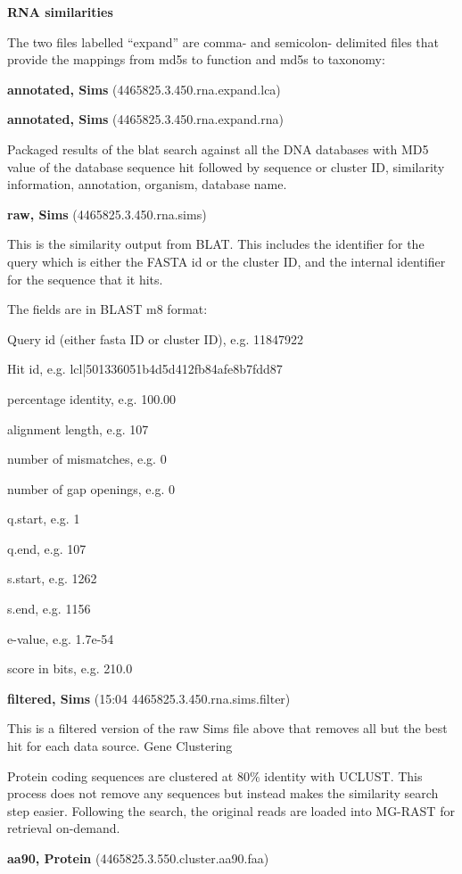 \documentclass[12pt,fullpage]{report}
\begin{document}
\begin{appendices}
\begin{mdframed}
\textbf{RNA similarities}

The two files labelled ``expand'' are comma- and semicolon- delimited files that provide the mappings from md5s to function and md5s to taxonomy:

\textbf{annotated, Sims} (4465825.3.450.rna.expand.lca)

\textbf{annotated, Sims} (4465825.3.450.rna.expand.rna)

Packaged results of the blat search against all the DNA databases with \gls{MD5} value of the database sequence hit followed by sequence or cluster ID, similarity information, annotation, organism, database name.

\textbf{raw, Sims} (4465825.3.450.rna.sims)

This is the similarity output from BLAT. This includes the identifier for the query which is either the FASTA id or the cluster ID, and the internal identifier for the sequence that it hits.

The fields are in BLAST m8 format:

    Query id (either fasta ID or cluster ID), e.g. 11847922

    Hit id, e.g. lcl|501336051b4d5d412fb84afe8b7fdd87

    percentage identity, e.g. 100.00

    alignment length, e.g. 107

    number of mismatches, e.g. 0

    number of gap openings, e.g. 0

    q.start, e.g. 1

    q.end, e.g. 107

    s.start, e.g. 1262

    s.end, e.g. 1156

    e-value, e.g. 1.7e-54

    score in bits, e.g. 210.0

\textbf{filtered, Sims} (15:04 4465825.3.450.rna.sims.filter)

This is a filtered version of the raw Sims file above that removes all but the best hit for each data source.
Gene Clustering

Protein coding sequences are clustered at 80\% identity with UCLUST. This process does not remove any sequences but instead makes the similarity search step easier. Following the search, the original reads are loaded into MG-RAST for retrieval on-demand.

\textbf{aa90, Protein} (4465825.3.550.cluster.aa90.faa)


\end{mdframed}
\end{appendices}
\end{document}

